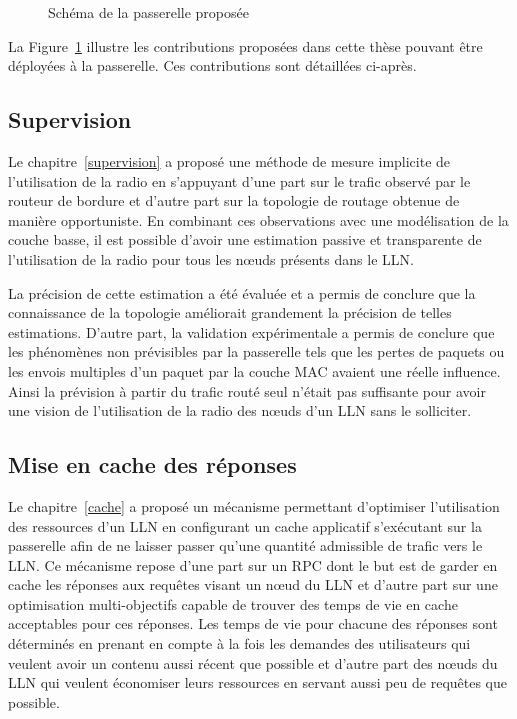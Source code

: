 \begin{figure}[ht]
  \centering
  
  \caption{Schéma de la passerelle proposée}
  \label{conclusion:schema}
\end{figure}

La Figure~\ref{conclusion:schema} illustre les contributions proposées dans cette thèse pouvant être déployées à la passerelle.
Ces contributions sont détaillées ci-après.

\subsection{Supervision}

Le chapitre~\ref{supervision} a proposé une méthode de mesure implicite de l'utilisation de la radio en s'appuyant d'une part sur le trafic observé par le routeur de bordure et d'autre part sur la topologie de routage obtenue de manière opportuniste.
En combinant ces observations avec une modélisation de la couche basse, il est possible d'avoir une estimation passive et transparente de l'utilisation de la radio pour tous les nœuds présents dans le \ac{LLN}.

La précision de cette estimation a été évaluée et a permis de conclure que la connaissance de la topologie améliorait grandement la précision de telles estimations.
D'autre part, la validation expérimentale a permis de conclure que les phénomènes non prévisibles par la passerelle tels que les pertes de paquets ou les envois multiples d'un paquet par la couche MAC avaient une réelle influence.
Ainsi la prévision à partir du trafic routé seul n'était pas suffisante pour avoir une vision de l'utilisation de la radio des nœuds d'un \ac{LLN} sans le solliciter.

\subsection{Mise en cache des réponses}

Le chapitre~\ref{cache} a proposé un mécanisme permettant d'optimiser l'utilisation des ressources d'un \ac{LLN} en configurant un cache applicatif s’exécutant sur la passerelle afin de ne laisser passer qu'une quantité admissible de trafic vers le \ac{LLN}.
Ce mécanisme repose d'une part sur un \ac{RPC} dont le but est de garder en cache les réponses aux requêtes visant un nœud du \ac{LLN} et d'autre part sur une optimisation multi-objectifs capable de trouver des temps de vie en cache acceptables pour ces réponses.
Les temps de vie pour chacune des réponses sont déterminés en prenant en compte à la fois les demandes des utilisateurs qui veulent avoir un contenu aussi récent que possible et d'autre part des nœuds du \ac{LLN} qui veulent économiser leurs ressources en servant aussi peu de requêtes que possible.

